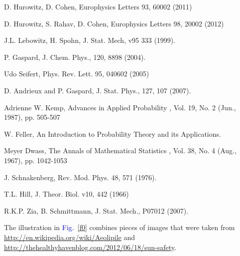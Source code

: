 \documentclass[aps,pre,floats,floatfix,twocolumn]{revtex4}
\newcommand{\Fig}[1]{\textcolor{blue}{Fig.}\!\!~\ref{#1}}
\begin{document}
\begin{thebibliography}{99}

D. Hurowitz, D. Cohen,
Europhysics Letters 93, 60002 (2011) 


D. Hurowitz, S. Rahav, D. Cohen,
Europhysics Letters 98, 20002 (2012) 



J.L. Lebowitz, H. Spohn, J. Stat. Mech, v95 333 (1999).

P. Gaspard, J. Chem. Phys., 120, 8898 (2004).

Udo Seifert, 
Phys. Rev. Lett. 95, 040602 (2005)

D. Andrieux and P. Gaspard, J. Stat. Phys., 127, 107 (2007).



Adrienne W. Kemp,
Advances in Applied Probability , Vol. 19, No. 2 (Jun., 1987), pp. 505-507

W. Feller, 
An Introduction to Probability Theory and its Applications.

Meyer Dwass,
The Annals of Mathematical Statistics , Vol. 38, No. 4 (Aug., 1967), pp. 1042-1053



J. Schnakenberg,
Rev. Mod. Phys. 48, 571 (1976).

T.L. Hill, 
J. Theor. Biol. v10, 442 (1966)

R.K.P. Zia, B. Schmittmann, 
J. Stat. Mech., P07012 (2007).




The illustration in \Fig{f0} combines pieces of images 
that were taken from \url{http://en.wikipedia.org/wiki/Aeolipile} 
and \url{http://thehealthyhavenblog.com/2012/06/18/sun-safety}.


\end{thebibliography}
\end{document}
